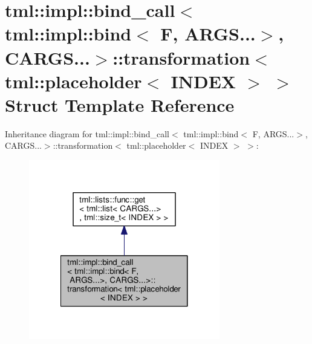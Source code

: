 \hypertarget{structtml_1_1impl_1_1bind__call_3_01tml_1_1impl_1_1bind_3_01_f_00_01_a_r_g_s_8_8_8_4_00_01_c_a_re2c1dd0176c648dfd458dbcdff116bba}{\section{tml\+:\+:impl\+:\+:bind\+\_\+call$<$ tml\+:\+:impl\+:\+:bind$<$ F, A\+R\+G\+S...$>$, C\+A\+R\+G\+S...$>$\+:\+:transformation$<$ tml\+:\+:placeholder$<$ I\+N\+D\+E\+X $>$ $>$ Struct Template Reference}
\label{structtml_1_1impl_1_1bind__call_3_01tml_1_1impl_1_1bind_3_01_f_00_01_a_r_g_s_8_8_8_4_00_01_c_a_re2c1dd0176c648dfd458dbcdff116bba}
}


Inheritance diagram for tml\+:\+:impl\+:\+:bind\+\_\+call$<$ tml\+:\+:impl\+:\+:bind$<$ F, A\+R\+G\+S...$>$, C\+A\+R\+G\+S...$>$\+:\+:transformation$<$ tml\+:\+:placeholder$<$ I\+N\+D\+E\+X $>$ $>$\+:
\nopagebreak
\begin{figure}[H]
\begin{center}
\leavevmode
\includegraphics[width=236pt]{structtml_1_1impl_1_1bind__call_3_01tml_1_1impl_1_1bind_3_01_f_00_01_a_r_g_s_8_8_8_4_00_01_c_a_r817b138f6b3add5d0225d8d400e694a5}
\end{center}
\end{figure}


